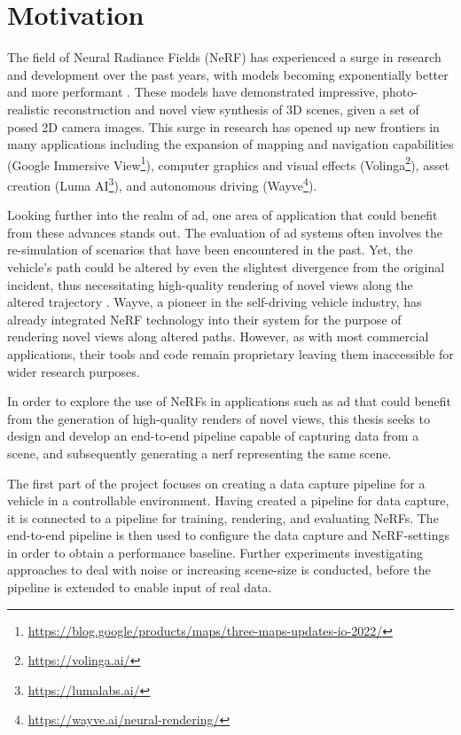\section{Motivation}
The field of Neural Radiance Fields (NeRF) has experienced a surge in research and development over the past years, with models becoming exponentially better and more performant \cite{debbagh_neural_2023}. These models have demonstrated impressive, photo-realistic reconstruction and novel view synthesis of 3D scenes, given a set of posed 2D camera images. This surge in research has opened up new frontiers in many applications including the expansion of mapping and navigation capabilities (Google Immersive View\footnote{\url{https://blog.google/products/maps/three-maps-updates-io-2022/}}), computer graphics and visual effects (Volinga\footnote{\url{https://volinga.ai/}}), asset creation (Luma AI\footnote{\url{https://lumalabs.ai/}}), and autonomous driving (Wayve\footnote{\url{https://wayve.ai/neural-rendering/}}). 

Looking further into the realm of \acrshort{ad}, one area of application that could benefit from these advances stands out. The evaluation of \acrshort{ad} systems often involves the re-simulation of scenarios that have been encountered in the past. Yet, the vehicle's path could be altered by even the slightest divergence from the original incident, thus necessitating high-quality rendering of novel views along the altered trajectory \cite{tancikBlockNeRFScalableLarge2022}. Wayve, a pioneer in the self-driving vehicle industry, has already integrated NeRF technology into their system for the purpose of rendering novel views along altered paths. However, as with most commercial applications, their tools and code remain proprietary leaving them inaccessible for wider research purposes.

In order to explore the use of NeRFs in applications such as \acrshort{ad} that could benefit from the generation of high-quality renders of novel views, this thesis seeks to design and develop an end-to-end pipeline capable of capturing data from a scene, and subsequently generating a \acrshort{nerf} representing the same scene. 

The first part of the project focuses on creating a data capture pipeline for a vehicle in a controllable environment. Having created a pipeline for data capture, it is connected to a pipeline for training, rendering, and evaluating NeRFs. The end-to-end pipeline is then used to configure the data capture and NeRF-settings in order to obtain a performance baseline. Further experiments investigating approaches to deal with noise or increasing scene-size is conducted, before the pipeline is extended to enable input of real data.

